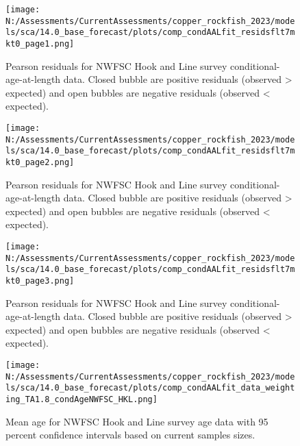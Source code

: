 \documentclass[11pt,
  english,
  letterpaper,
]{article}
\begin{document}
\pagebreak

\begin{figure}
\centering
\texttt{[image: N:/Assessments/CurrentAssessments/copper\_rockfish\_2023/models/sca/14.0\_base\_forecast/plots/comp\_condAALfit\_residsflt7mkt0\_page1.png]}
\caption{Pearson residuals for NWFSC Hook and Line survey conditional-age-at-length data. Closed bubble are positive residuals (observed \textgreater{} expected) and open bubbles are negative residuals (observed \textless{} expected).\label{fig:nwfsc-hkl-age-pearson-1}}
\end{figure}

\pagebreak

\begin{figure}
\centering
\texttt{[image: N:/Assessments/CurrentAssessments/copper\_rockfish\_2023/models/sca/14.0\_base\_forecast/plots/comp\_condAALfit\_residsflt7mkt0\_page2.png]}
\caption{Pearson residuals for NWFSC Hook and Line survey conditional-age-at-length data. Closed bubble are positive residuals (observed \textgreater{} expected) and open bubbles are negative residuals (observed \textless{} expected).\label{fig:nwfsc-hkl-age-pearson-2}}
\end{figure}

\pagebreak

\begin{figure}
\centering
\texttt{[image: N:/Assessments/CurrentAssessments/copper\_rockfish\_2023/models/sca/14.0\_base\_forecast/plots/comp\_condAALfit\_residsflt7mkt0\_page3.png]}
\caption{Pearson residuals for NWFSC Hook and Line survey conditional-age-at-length data. Closed bubble are positive residuals (observed \textgreater{} expected) and open bubbles are negative residuals (observed \textless{} expected).\label{fig:nwfsc-hkl-age-pearson-3}}
\end{figure}

\pagebreak

\begin{figure}
\centering
\texttt{[image: N:/Assessments/CurrentAssessments/copper\_rockfish\_2023/models/sca/14.0\_base\_forecast/plots/comp\_condAALfit\_data\_weighting\_TA1.8\_condAgeNWFSC\_HKL.png]}
\caption{Mean age for NWFSC Hook and Line survey age data with 95 percent confidence intervals based on current samples sizes.\label{fig:nwfsc-hkl-mean-age-fit}}
\end{figure}

\pagebreak
\end{document}
